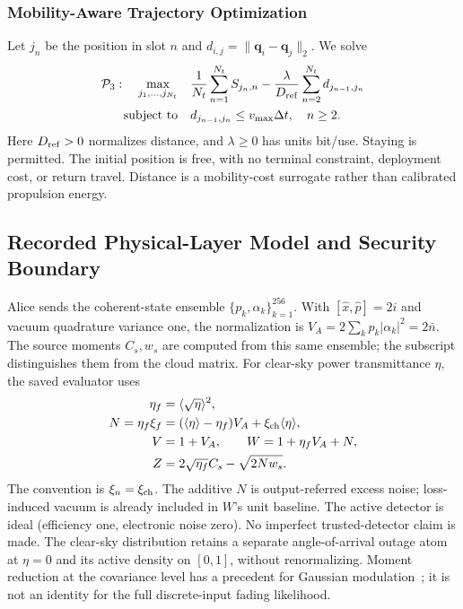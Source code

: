 \subsubsection{Mobility-Aware Trajectory Optimization}
Let $j_n$ be the position in slot $n$ and
$d_{i,j}=\|\mathbf q_i-\mathbf q_j\|_2$. We solve
\begin{align}
 \mathcal P_3:\quad\max_{j_1,\ldots,j_{N_t}}\quad&
 \frac{1}{N_t}\sum_{n=1}^{N_t}S_{j_n,n}
 -\frac{\lambda}{D_{\rm ref}}\sum_{n=2}^{N_t}d_{j_{n-1},j_n}
 \label{eq:p3}\\
 \text{subject to}\quad& d_{j_{n-1},j_n}\le v_{\max}\Delta t,
 \quad n\ge2.\nonumber
\end{align}
Here $D_{\rm ref}>0$ normalizes distance, and $\lambda\ge0$ has units
bit/use. Staying is permitted. The initial position is free, with no
terminal constraint, deployment cost, or return travel. Distance is a
mobility-cost surrogate rather than calibrated propulsion energy.

\subsection{Recorded Physical-Layer Model and Security Boundary}
\label{sec:security}
Alice sends the coherent-state ensemble $\{p_k,\alpha_k\}_{k=1}^{256}$.
With $[\hat x,\hat p]=2i$ and vacuum quadrature variance one, the
normalization is $V_A=2\sum_kp_k|\alpha_k|^2=2\bar n$.
The source moments $C_s,w_s$ are computed from this same ensemble;
the subscript distinguishes them from the cloud matrix.
For clear-sky power transmittance $\eta$, the saved evaluator uses
\begin{align*}
 \eta_f&=\langle\sqrt\eta\rangle^2,\\
 N=\eta_f\xi_f&=(\langle\eta\rangle-\eta_f)V_A
                  +\xi_{\rm ch}\langle\eta\rangle,\\
 V&=1+V_A,\qquad W=1+\eta_fV_A+N,\\
 Z&=2\sqrt{\eta_f}C_s-\sqrt{2Nw_s}.
\end{align*}
The convention is $\xi_n=\xi_{\rm ch}$. The additive $N$ is
output-referred excess noise; loss-induced vacuum is already included
in $W$'s unit baseline. The active detector is ideal (efficiency one,
electronic noise zero). No imperfect trusted-detector claim is made.
The clear-sky distribution retains a separate angle-of-arrival outage
atom at $\eta=0$ and its active density on $[0,1]$, without renormalizing.
Moment reduction at the covariance level has a precedent for Gaussian
modulation~\cite{usenko2012}; it is not an identity for the full
discrete-input fading likelihood.

